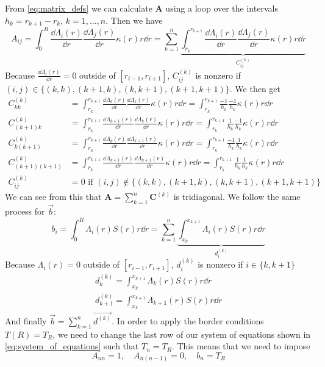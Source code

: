From \autoref{eq:matrix_defs} we can calculate \(\mathbf{A}\) using a loop over the intervals \(h_k = r_{k+1} - r_k\), \(k = 1, \dots, n\). Then we have
\begin{equation}
    A_{ij}
    = \int_0^R \frac{\dd \Lambda_i(r)}{\dd r} \frac{\dd \Lambda_j(r)}{\dd r} \kappa(r) r \dd r
    = \sum_{k=1}^n \underbrace{\int_{r_k}^{r_{k+1}} \frac{\dd \Lambda_i(r)}{\dd r} \frac{\dd \Lambda_j(r)}{\dd r} \kappa(r) r \dd r}_{C_{ij}^{(k)}}
\end{equation}
Because \(\frac{\dd \Lambda_i(r)}{\dd r} = 0\) outside of \([r_{i-1}, r_{i+1}]\), \(C^{(k)}_{ij}\) is nonzero if \((i,j) \in \{(k,k), (k+1,k), (k,k+1), (k+1,k+1)\}\). We then get
\begin{align*}
    C^{(k)}_{kk} &= \int_{r_{k}}^{r_{k+1}} \frac{\dd \Lambda_{k}(r)}{\dd r} \frac{\dd \Lambda_{k}(r)}{\dd r} \kappa(r) r \dd r = \int_{r_{k}}^{r_{k+1}} \frac{-1}{h_k} \frac{-1}{h_k} \kappa(r) r \dd r \\
    C^{(k)}_{(k+1)k} &= \int_{r_{k}}^{r_{k+1}} \frac{\dd \Lambda_{k+1}(r)}{\dd r} \frac{\dd \Lambda_{k}(r)}{\dd r} \kappa(r) r \dd r = \int_{r_{k}}^{r_{k+1}} \frac{1}{h_k} \frac{-1}{h_k} \kappa(r) r \dd r \\
    C^{(k)}_{k(k+1)} &= \int_{r_{k}}^{r_{k+1}} \frac{\dd \Lambda_{k}(r)}{\dd r} \frac{\dd \Lambda_{k+1}(r)}{\dd r} \kappa(r) r \dd r = \int_{r_{k}}^{r_{k+1}} \frac{-1}{h_k} \frac{1}{h_k} \kappa(r) r \dd r \\
    C^{(k)}_{(k+1)(k+1)} &= \int_{r_{k}}^{r_{k+1}} \frac{\dd \Lambda_{k+1}(r)}{\dd r} \frac{\dd \Lambda_{k+1}(r)}{\dd r} \kappa(r) r \dd r = \int_{r_{k}}^{r_{k+1}} \frac{1}{h_k} \frac{1}{h_k} \kappa(r) r \dd r \\
    C^{(k)}_{ij} &= 0 \textrm{ if } (i,j) \notin \{(k,k), (k+1,k), (k,k+1), (k+1,k+1)\}
\end{align*}
We can see from this that \(\mathbf{A} = \sum_{k=1}^{n} \mathbf{C}^{(k)}\) is tridiagonal. We follow the same process for \(\vec{b}\):
\begin{equation}
    b_i = \int_0^R \Lambda_i(r) S(r) r \dd r = \sum_{k=1}^{n} \underbrace{\int_{x_k}^{x_{k+1}} \Lambda_i(r) S(r) r \dd r}_{d^{(k)}_i}
\end{equation}
Because \(\Lambda_i(r) = 0\) outside of \([r_{i-1}, r_{i+1}]\), \(d^{(k)}_i\) is nonzero if \(i \in \{k, k+1\}\)
\begin{align*}
    d^{(k)}_k = \int_{x_k}^{x_{k+1}} \Lambda_k(r) S(r) r \dd r \\
    d^{(k)}_{k+1} = \int_{x_k}^{x_{k+1}} \Lambda_{k+1}(r) S(r) r \dd r
\end{align*}
And finally \(\vec{b} = \sum_{k=1}^{n} \overrightarrow{d^{(k)}}\). In order to apply the border conditions \(T(R) = T_R\), we need to change the last row of our system of equations shown in \autoref{eq:system_of_equations} such that \(T_n = T_R\). This means that we need to impose
\begin{equation}
    A_{nn} = 1, \quad A_{n(n-1)} = 0, \quad b_n = T_R
\end{equation}

